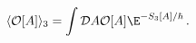 \begin{equation}
\langle {\cal O}[A] \rangle_3 =
\int {\cal D}A {\cal O}[A] \E^{-S_3[A]/\hbar} \, .
\label{eq47}
\end{equation}

